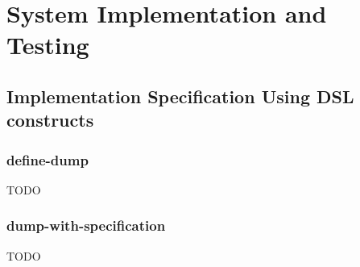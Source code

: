 \chapter{System Implementation and Testing}
\section{Implementation Specification Using DSL constructs}
\subsection{define-dump}
TODO
\subsection{dump-with-specification}
TODO

